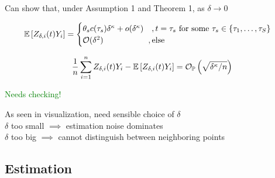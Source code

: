 \begin{frame}
    \vspace{-0.5cm}

    Can show that, under Assumption 1 and Theorem 1, as $\delta \to 0$

    \vspace{0.5cm}

    \[
    \mathbb{E}\left[Z_{\delta, i}(t) Y_i\right] = 
        \begin{cases}
            \theta_s c(\tau_s) \delta^{\kappa} + o(\delta^{\kappa}) \quad, t = \tau_s
            \text{ for some } \tau_s \in \{\tau_1, \dots, \tau_S\}\\
            \mathcal{O}(\delta^2) \quad\quad\quad\quad\quad\,\,\,, \text{else}
        \end{cases}
    \]

    \vspace{0.5cm}

    \[
    \frac{1}{n} \sum_{i = 1}^n Z_{\delta, i}(t) Y_i - \mathbb{E}\left[Z_{\delta, i}(t) Y_i\right]
    = \mathcal{O}_{\mathbb{P}} \left( \sqrt{\delta^{\kappa} / n} \right)
    \]

    \vspace{0.5cm}

    \textcolor{green}{Needs checking!}

    As seen in visualization, need sensible choice of $\delta$\\[1em]
     $\delta$ too small $\implies$ estimation noise dominates\\
     $\delta$ too big $\implies$ cannot distinguish between neighboring points


\end{frame}


\subsection{Estimation}

